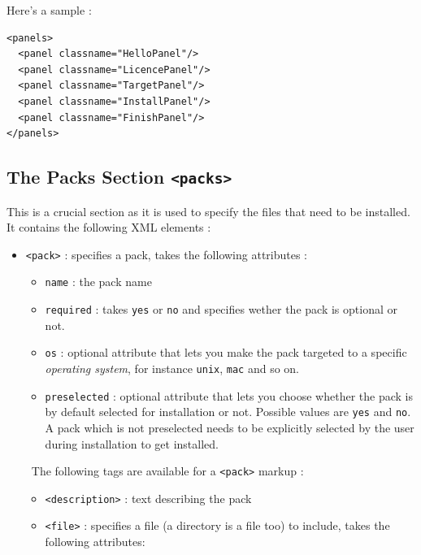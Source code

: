 Here's a sample :
\footnotesize
\begin{verbatim}
<panels>
  <panel classname="HelloPanel"/>
  <panel classname="LicencePanel"/>
  <panel classname="TargetPanel"/>
  <panel classname="InstallPanel"/>
  <panel classname="FinishPanel"/>
</panels>
\end{verbatim}
\normalsize

\subsection{The Packs Section \texttt{<packs>}}

This is a crucial section as it is used to specify the files that need
to be installed. It contains the following XML elements :\\
\begin{itemize}

  \item \texttt{<pack>} : specifies a pack, takes the following attributes :
  \begin{itemize}
  
    \item \texttt{name} : the pack name
    \item \texttt{required} : takes \texttt{yes} or \texttt{no} and specifies
    wether the pack is optional or not.
    \item \texttt{os} : optional attribute that lets you make the pack targeted
    to a specific \textsl{operating system}, for instance \texttt{unix},
    \texttt{mac} and so on.
    \item \texttt{preselected} : optional attribute that lets you choose whether
    the pack is by default selected for installation or not. Possible values
    are \texttt{yes} and \texttt{no}. A pack which is not preselected needs to
    be explicitly selected by the user during installation to get installed.
    
  \end{itemize}\
  The following tags are available for a \texttt{<pack>} markup :
  \begin{itemize}
  
    \item \texttt{<description>} : text describing the pack
    \item \texttt{<file>} : specifies a file (a directory is a file too) to include, takes the following attributes:
    \begin{itemize}
    

\end{itemize}
\end{itemize}
\end{itemize}
